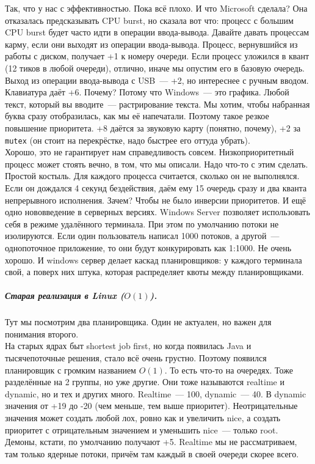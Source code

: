 \documentclass{article}
\begin{document}
    Так, что у нас с эффективностью. Пока всё плохо. И что Microsoft сделала? Она отказалась предсказывать CPU burst, но сказала вот что: процесс с большим CPU burst будет часто идти в операции ввода-вывода. Давайте давать процессам карму, если они выходят из операции ввода-вывода. Процесс, вернувшийся из работы с диском, получает +1 к номеру очереди. Если процесс уложился в квант (12 тиков в любой очереди), отлично, иначе мы опустим его в базовую очередь. Выход из операции ввода-вывода с USB~--- +2, но интереснее с ручным вводом. Клавиатура даёт +6. Почему? Потому что Windows~--- это графика. Любой текст, который вы вводите~--- растрирование текста. Мы хотим, чтобы набранная буква сразу отобразилась, как мы её напечатали. Поэтому такое резкое повышение приоритета. +8 даётся за звуковую карту (понятно, почему), +2 за \Verb|mutex| (он стоит на перекрёстке, надо быстрее его оттуда убрать).\\
    Хорошо, это не гарантирует нам справедливость совсем. Низкоприоритетный процесс может стоять вечно, в том, что мы описали. Надо что-то с этим сделать. Простой костыль. Для каждого процесса считается, сколько он не выполнялся. Если он дождался 4 секунд бездействия, даём ему 15 очередь сразу и два кванта непрерывного исполнения. Зачем? Чтобы не было инверсии приоритетов. И ещё одно нововведение в серверных версиях. Windows Server позволяет использовать себя в режиме удалённого терминала. При этом по умолчанию потоки не изолируются. Если один пользователь написал 1000 потоков, а другой~--- однопоточное приложение, то они будут конкурировать как 1:1000. Не очень хорошо. И windows сервер делает каскад планировщиков: у каждого терминала свой, а поверх них штука, которая распределяет квоты между планировщиками.
    \subparagraph{Старая реализация в Linux ($O(1)$).}
    Тут мы посмотрим два планировщика. Один не актуален, но важен для понимания второго.\\
    На старых ядрах быт shortest job first, но когда появилась Java и тысячепоточные решения, стало всё очень грустно. Поэтому появился планировщик с громким названием $O(1)$. То есть что-то на очередях. Тоже разделённые на 2 группы, но уже другие. Они тоже называются realtime и dynamic, но и тех и других много. Realtime~--- 100, dynamic~--- 40. В dynamic значения от +19 до -20 (чем меньше, тем выше приоритет). Неотрицательные значения может создать любой лох, ровно как и увеличить nice, а создать приоритет с отрицательным значением и уменьшить nice~--- только root. Демоны, кстати, по умолчанию получают +5. Realtime мы не рассматриваем, там только ядерные потоки, причём там каждый в своей очереди скорее всего.\\
\end{document}
